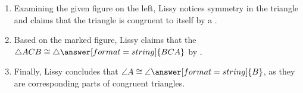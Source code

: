 \documentclass[nooutcomes]{ximera}
\begin{document}
\begin{problem}
\begin{enumerate}
\item Examining the given figure on the left, Lissy notices symmetry in the triangle and claims that the triangle is congruent to itself by a .  

\item Based on the marked figure, Lissy claims that the $\triangle ACB\cong \triangle\answer[format=string]{BCA}$ by . 

\item Finally, Lissy concludes that $\angle A\cong \angle\answer[format=string]{B}$, as they are corresponding parts of congruent triangles. 
\end{enumerate}

\end{problem}
\end{document}
